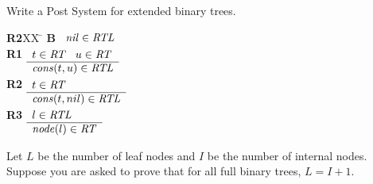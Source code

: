 \documentclass[]{exam}
\theoremstyle{definition}
\newcommand{\id}[1]{\mbox{\it #1\/}}
\begin{document}
\begin{questions}
\begin{solution}
\end{solution}
\question Write a Post System for extended binary trees.
\begin{solution}
\begin{tabbing}
{\bf R2}XX \=  \kill
{\bf B} \>
        \(\begin{array}[t]{l}
        \id{nil}\in\id{RTL}
        \end{array}\) \\[2ex]
{\bf R1} \>
        \(\begin{array}[t]{l}
        t\in\id{RT}\;\;\;u\in\id{RT} \\
        \hline
        \id{cons}(t,u)\in\id{RTL}
        \end{array}\) \\[2ex]
{\bf R2} \>
        \(\begin{array}[t]{l}
        t\in\id{RT} \\
        \hline
        \id{cons}(t,nil)\in\id{RTL}
        \end{array}\) \\[2ex]
{\bf R3} \>
        \(\begin{array}[t]{l}
        l\in\id{RTL} \\
        \hline
        \id{node}(l)\in\id{RT}
        \end{array}\)

\end{tabbing}

\end{solution}

\question Let $L$ be the number of leaf nodes and $I$ be the number
          of internal nodes. Suppose you are asked to prove that for all 
          full binary trees, $L = I + 1$.
\end{questions}
\end{document}
